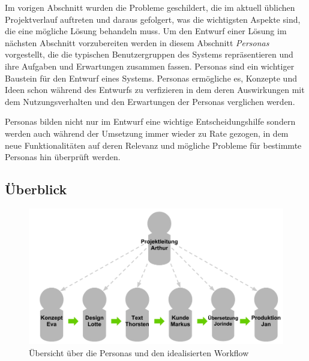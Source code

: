 Im vorigen Abschnitt wurden die Probleme geschildert, die im aktuell üblichen Projektverlauf auftreten und daraus gefolgert, was die wichtigsten Aspekte sind, die eine mögliche Lösung behandeln muss. Um den Entwurf einer Lösung im nächsten Abschnitt vorzubereiten werden in diesem Abschnitt \emph{Personas} vorgestellt, die die typischen Benutzergruppen des Systems repräsentieren und ihre Aufgaben und Erwartungen zusammen fassen. Personas sind ein wichtiger Baustein für den Entwurf eines Systems. Personas ermögliche es, Konzepte und Ideen schon während des Entwurfs zu verfizieren in dem deren Auswirkungen mit dem Nutzungsverhalten und den Erwartungen der Personas verglichen werden.

\begin{quote}
 \cite[S.15 ff.]{brown2007communicating}
\end{quote}

Personas bilden nicht nur im Entwurf eine wichtige Entscheidungshilfe sondern werden auch während der Umsetzung immer wieder zu Rate gezogen, in dem neue Funktionalitäten auf deren Relevanz und mögliche Probleme für bestimmte Personas hin überprüft werden. \cite[S.38 ff.]{cohn2004user}

\subsection{Überblick}

\begin{figure}[htb]
\begin{center}
\includegraphics[width=\textwidth]{media/Uebersicht-Personas.pdf}
\caption{Übersicht über die Personas und den idealisierten Workflow}
\label{chart:uebersicht-personas}
\end{center}
\end{figure}

